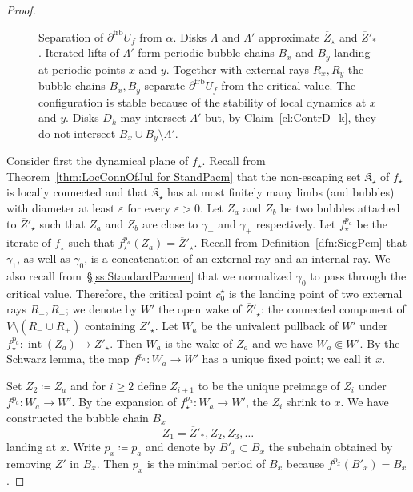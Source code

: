 \documentclass[]{amsart}
\newcommand{\bLambda}{{\mathbb{\Lambda}}}
\newcommand\intr{\operatorname{int}}
\newcommand\Kfilled{{\mathfrak K}}
\newcommand{\str}{{\star}}
\newcommand\frb{{\operatorname{frb}}}
\theoremstyle{remark}
\numberwithin{equation}{section}
\theoremstyle{definition}
\begin{document}
\begin{proof}
\begin{figure}[t!]
{
\caption{Separation of $\partial ^\frb U_f$ from $\alpha$. Disks $\bLambda$ and $\bLambda'$ approximate $\overline Z_\str$ and $\overline Z'_*$. Iterated lifts of $\bLambda'$ form periodic bubble chains $B_x$ and $B_y$ landing at periodic points $x$ and $y$. Together with external rays $R_x,R_y$ the bubble chains $B_x,B_y$ separate $\partial ^\frb U_f$ from the critical value. The configuration is stable because of the stability of local dynamics at $x$ and $y$. Disks $D_k$ may intersect $\bLambda'$ but, by Claim~\ref{cl:ContrD_k}, they do not intersect $B_x\cup B_y\setminus \bLambda'$.} \label{Fig:SepForbSector}}
\end{figure}
 
Consider first the dynamical plane of $f_\str$. Recall from Theorem~\ref{thm:LocConnOfJul for StandPacm} that the non-escaping set $\Kfilled_\str$ of $f_\str$ is locally connected and that $\Kfilled_\str$ has at most finitely many limbs (and bubbles) with diameter at least $\varepsilon$ for every $\varepsilon>0$. Let $Z_a$ and $Z_b$ be two bubbles attached to $\overline Z'_\str$ such that $Z_a$ and $Z_b$ are close to $\gamma_-$ and $\gamma_+$ respectively.  Let $f_\str^{p_a}$ be the iterate of $f_\str$ such that $f_\str^{p_a}(Z_a)=\overline Z'_\str$. Recall from Definition~\ref{dfn:SiegPcm} that $\gamma_1$, as well as  $\gamma_0$, is a concatenation of an external ray and an internal ray. We also recall from~\S\ref{ss:StandardPacmen} that we normalized $\gamma_0$ to pass through the critical value. Therefore, the critical point $c_0^\str$ is the landing point of two external rays $R_{-}, R_+$; we denote by $W'$ the open wake of $\overline Z'_\str$: the connected component of $V\setminus (R_-\cup R_+)$ containing $Z'_\str$. Let $W_a$ be the univalent pullback of $W'$ under ${f_\str^{p_a}\colon \intr(Z_a)\to Z'_\str}$. Then $W_a$ is the wake of $Z_a$ and we have $W_a\Subset W'$. By the Schwarz lemma, the map $f^{p_a}\colon W_a\to W'$ has a unique fixed point; we call it $x$. 


Set $Z_2\coloneqq Z_a$ and for $i\ge 2$ define $Z_{i+1}$ to be the unique preimage of $Z_i$ under $f^{p_a}\colon W_a\to W'$. By the expansion of $f_\str^{p_a}\colon W_a\to W'$, the $Z_i$ shrink to $x$. We have constructed the bubble chain $B_x$
\begin{equation}
\label{eq:B_x}
 Z_{1}=  \overline Z'_{*},  Z_{2},  Z_{3}, \dots \end{equation} 
 landing at $x$. Write $p_x\coloneqq p_a$ and denote by $B'_x\subset B_x$ the subchain obtained by removing $\overline Z'$ in $B_x$. Then $p_x$ is the minimal period of $B_x$ because ${f^{p_x}(B'_x)=B_x}$.
 


\end{proof}
\end{document}
